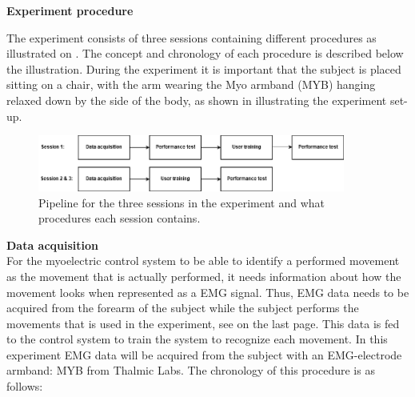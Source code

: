 \textbf{\Large{Experiment procedure}}

The experiment consists of three sessions containing different procedures as illustrated on . The concept and chronology of each procedure is described below the illustration. During the experiment it is important that the subject is placed sitting on a chair, with the arm wearing the Myo armband (MYB) hanging relaxed down by the side of the body, as shown in  illustrating the experiment set-up. 

\begin{figure}[H]                                         
	\includegraphics[width=0.9\textwidth]{figures/pMethods/experiment_protocol_pipeline}  
	\caption{Pipeline for the three sessions in the experiment and what procedures each session contains.}
	\label{fig:experiment_protocol_pipeline} 
\end{figure}


\textbf{Data acquisition} \\
For the myoelectric control system to be able to identify a performed movement as the movement that is actually performed, it needs information about how the movement looks when represented as a EMG signal. Thus, EMG data needs to be acquired from the forearm of the subject while the subject performs the movements that is used in the experiment, see  on the last page. This data is fed to the control system to train the system to recognize each movement. In this experiment EMG data will be acquired from the subject with an EMG-electrode armband: MYB from Thalmic Labs. The chronology of this procedure is as follows:

